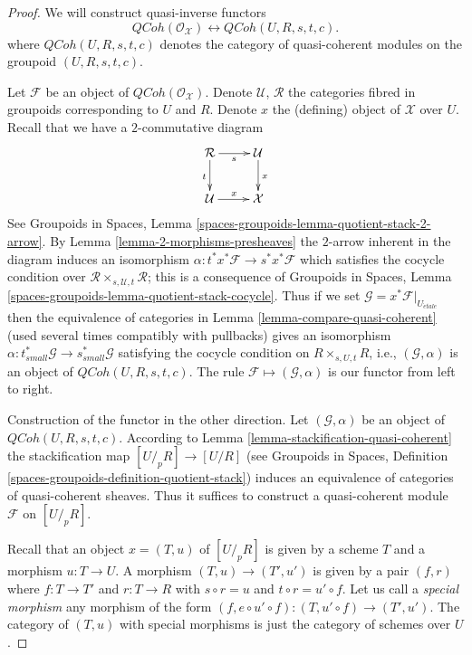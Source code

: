 \documentclass[10pt,a4paper]{amsart}
\theoremstyle{plain}
\theoremstyle{definition}
\theoremstyle{remark}
\numberwithin{equation}{subsection}
\def\etale{{\acute{e}tale}}
\def\QCoh{\mathit{QCoh}}
\begin{document}
\begin{proof}
We will construct quasi-inverse functors
$$
\QCoh(\mathcal{O}_\mathcal{X})
\longleftrightarrow
\QCoh(U, R, s, t, c).
$$
where $\QCoh(U, R, s, t, c)$ denotes the category of quasi-coherent modules
on the groupoid $(U, R, s, t, c)$.

\medskip\noindent
Let $\mathcal{F}$ be an object of $\QCoh(\mathcal{O}_\mathcal{X})$.
Denote $\mathcal{U}$, $\mathcal{R}$ the categories fibred in groupoids
corresponding to $U$ and $R$. Denote $x$ the (defining) object of $\mathcal{X}$
over $U$. Recall that we have a $2$-commutative diagram
$$
\xymatrix{
\mathcal{R} \ar[r]_s \ar[d]_t & \mathcal{U} \ar[d]^x \\
\mathcal{U} \ar[r]^x & \mathcal{X}
}
$$
See Groupoids in Spaces, Lemma
\ref{spaces-groupoids-lemma-quotient-stack-2-arrow}.
By Lemma \ref{lemma-2-morphisms-presheaves}
the $2$-arrow inherent in the diagram induces an isomorphism
$\alpha : t^*x^*\mathcal{F} \to s^*x^*\mathcal{F}$
which satisfies the cocycle condition over
$\mathcal{R} \times_{s, \mathcal{U}, t} \mathcal{R}$;
this is a consequence of Groupoids in Spaces, Lemma
\ref{spaces-groupoids-lemma-quotient-stack-cocycle}.
Thus if we set $\mathcal{G} = x^*\mathcal{F}|_{U_\etale}$
then the equivalence of categories in
Lemma \ref{lemma-compare-quasi-coherent}
(used several times compatibly with pullbacks)
gives an isomorphism
$\alpha : t_{small}^*\mathcal{G} \to s_{small}^*\mathcal{G}$
satisfying the cocycle condition on $R \times_{s, U, t} R$, i.e.,
$(\mathcal{G}, \alpha)$ is an object of $\QCoh(U, R, s, t, c)$.
The rule $\mathcal{F} \mapsto (\mathcal{G}, \alpha)$ is our
functor from left to right.

\medskip\noindent
Construction of the functor in the other direction.
Let $(\mathcal{G}, \alpha)$ be an object of $\QCoh(U, R, s, t, c)$.
According to Lemma \ref{lemma-stackification-quasi-coherent}
the stackification map $[U/_{\!p}R] \to [U/R]$ (see
Groupoids in Spaces, Definition
\ref{spaces-groupoids-definition-quotient-stack})
induces an equivalence of categories of quasi-coherent sheaves.
Thus it suffices to construct a quasi-coherent module $\mathcal{F}$
on $[U/_{\!p}R]$.

\medskip\noindent
Recall that an object $x = (T, u)$ of $[U/_{\!p}R]$
is given by a scheme $T$ and a morphism $u : T \to U$. A morphism
$(T, u) \to (T', u')$ is given by a pair $(f, r)$ where $f : T \to T'$
and $r : T \to R$ with $s \circ r = u$ and $t \circ r = u' \circ f$.
Let us call a {\it special morphism} any morphism of the form
$(f, e \circ u' \circ f) : (T, u' \circ f) \to (T', u')$.
The category of $(T, u)$ with special morphisms is just the
category of schemes over $U$.


\end{proof}
\end{document}
